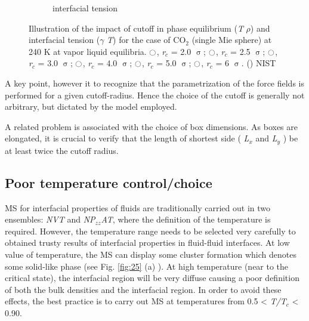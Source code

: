 \documentclass[9pt,bestpractices]{livecoms}
\begin{document}
\begin{figure}
\begin{subfigure}{\linewidth}
    \caption{interfacial tension}
	\end{subfigure}
\caption{Illustration of the impact of cutoff in phase equilibrium (\textit{T}
\textendash{} {${\rho}$}) and interfacial tension ({${\gamma}$} \textendash{}
\textit{T}) for the case of CO$_{2}$ (single Mie sphere) at 240 K at vapor
\textendash{} liquid equilibria. {\color{red}$\ocircle$}, \textit{r}$_{c}$ = 2.0 {${\upsigma}$}; {\color{blue!40}$\ocircle$},
\textit{r}$_{c}$ = 2.5 {${\upsigma}$}; {\color{blue}$\ocircle$}, \textit{r}$_{c}$ = 3.0
{${\upsigma}$}; {\color{green}$\ocircle$}, \textit{r}$_{c}$ = 4.0 {${\upsigma}$}; {\color{black!40}$\ocircle$}, \textit{r}$_{c}$
= 5.0 {${\upsigma}$}; $\ocircle$, \textit{r}$_{c}$ = 6 {${\upsigma}$}. (\textemdash{})
NIST \citep{lemmon2013}
}
\label{fig:24}
\end{figure}

A key point, however it to recognize that the parametrization of the force
fields is performed for a given cutoff-radius. Hence the choice of the cutoff
is generally not arbitrary, but dictated by the model employed. 

A related problem is associated with the choice of box dimensions. As boxes are
elongated, it is crucial to verify that the length of shortest side
( \textit{L}$_{x}$ and \textit{L}$_{y}$ ) be at least twice the cutoff radius.

\subsection{Poor temperature control/choice}

MS for interfacial properties of fluids are traditionally carried out in two
ensembles: \textit{NVT} and \textit{NP}$_{zz}$\textit{AT}, where the definition
of the temperature is required. However, the temperature range needs to be
selected very carefully to obtained trusty results of interfacial properties in
fluid-fluid interfaces. At low value of temperature, the MS can display
some cluster formation which denotes some solid-like phase (see Fig. \ref{fig:25} (a) ).
At high temperature (near to the critical state), the interfacial region will
be very diffuse causing a poor definition of both the bulk densities and the
interfacial region. In order to avoid these effects, the best practice is to
carry out MS at temperatures from 0.5 {\textless} \textit{T/T}$_{c}$
{\textless} 0.90.
\end{document}
